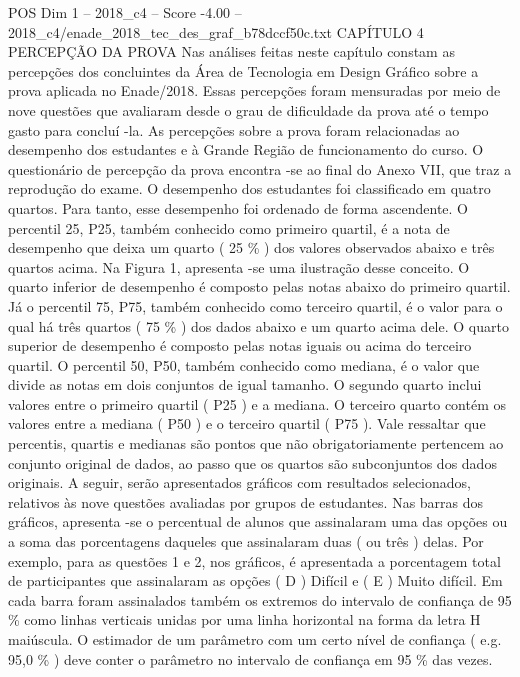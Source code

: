 \begin{textsample}{POS Dim 1 – 2018\_c4 – Score -4.00 – 2018\_c4/enade\_2018\_tec\_des\_graf\_b78dccf50c.txt}  \label{ex:f1_pos_308}
CAPÍTULO 4 PERCEPÇÃO DA PROVA Nas análises feitas neste capítulo constam as percepções dos concluintes da Área de Tecnologia em Design Gráfico sobre a prova aplicada no Enade/2018.
Essas percepções foram mensuradas por meio de nove questões que avaliaram desde o grau de dificuldade da prova até o tempo gasto para concluí -la.
As percepções sobre a prova foram relacionadas ao desempenho dos estudantes e à Grande Região de funcionamento do curso.
O questionário de percepção da prova encontra -se ao final do Anexo VII, que traz a reprodução do exame.
O desempenho dos estudantes foi classificado em quatro quartos.
Para tanto, esse desempenho foi ordenado de forma ascendente.
O percentil 25, P25, também conhecido como primeiro quartil, é a nota de desempenho que deixa um quarto ( 25 \% ) dos valores observados abaixo e três quartos acima.
Na Figura 1, apresenta -se uma ilustração desse conceito.
O quarto inferior de desempenho é composto pelas notas abaixo do primeiro quartil.
Já o percentil 75, P75, também conhecido como terceiro quartil, é o valor para o qual há três quartos ( 75 \% ) dos dados abaixo e um quarto acima dele.
O quarto superior de desempenho é composto pelas notas iguais ou acima do terceiro quartil.
O percentil 50, P50, também conhecido como mediana, é o valor que divide as notas em dois conjuntos de igual tamanho.
O segundo quarto inclui valores entre o primeiro quartil ( P25 ) e a mediana.
O terceiro quarto contém os valores entre a mediana ( P50 ) e o terceiro quartil ( P75 ).
Vale ressaltar que percentis, quartis e medianas são pontos que não obrigatoriamente pertencem ao conjunto original de dados, ao passo que os quartos são subconjuntos dos dados originais.
A seguir, serão apresentados gráficos com resultados selecionados, relativos às nove questões avaliadas por grupos de estudantes.
Nas barras dos gráficos, apresenta -se o percentual de alunos que assinalaram uma das opções ou a soma das porcentagens daqueles que assinalaram duas ( ou três ) delas.
Por exemplo, para as questões 1 e 2, nos gráficos, é apresentada a porcentagem total de participantes que assinalaram as opções ( D ) Difícil e ( E ) Muito difícil.
Em cada barra foram assinalados também os extremos do intervalo de confiança de 95 \% como linhas verticais unidas por uma linha horizontal na forma da letra H maiúscula.
O estimador de um parâmetro com um certo nível de confiança ( e.g. 95,0 \% ) deve conter o parâmetro no intervalo de confiança em 95 \% das vezes.

\end{textsample}
